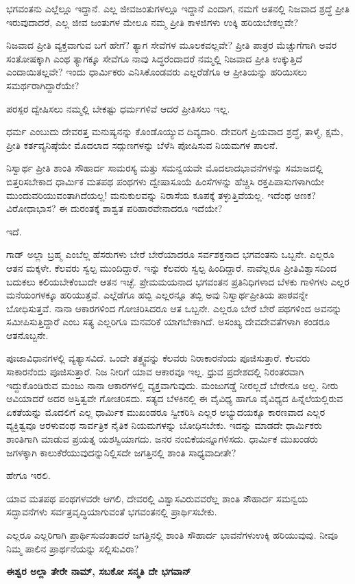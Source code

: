 ಭಗವಂತನು ಎಲ್ಲೆಲ್ಲೂ ಇದ್ದಾನೆ. ಎಲ್ಲ ಜೀವಜಂತುಗಳಲ್ಲೂ ಇದ್ದಾನೆ ಎಂದಾಗ, ನಮಗೆ ಆತನಲ್ಲಿ ನಿಜವಾದ ಶ್ರದ್ಧೆ ಪ್ರೀತಿ ಇರುವುದಾದರೆ, ಎಲ್ಲ ಜೀವ ಜಂತುಗಳ ಮೇಲೂ ನಮ್ಮ ಪ್ರೀತಿ ಕಾಳಜಿಗಳು ಉಕ್ಕಿ ಹರಿಯಬೇಕಲ್ಲವೇ?

ನಿಜವಾದ ಪ್ರೀತಿ ವ್ಯಕ್ತವಾಗುವ ಬಗೆ ಹೇಗೆ? ತ್ಯಾಗ ಸೇವೆಗಳ ಮೂಲಕವಲ್ಲವೇ? ಪ್ರೀತಿ ಪಾತ್ರರ ಮೆಚ್ಚುಗೆಗಾಗಿ ಅವರ ಸಂತೋಷಕ್ಕಾಗಿ ಎಂಥ ತ್ಯಾಗಕ್ಕೂ ಸೇವೆಗೂ ನಾವು ಸಿದ್ಧರೆಂದಾದರೆ ನಮ್ಮಲ್ಲಿ ನಿಜವಾದ ಪ್ರೀತಿ ಉಕ್ಕುತ್ತಿದೆ ಎಂದಾಯಿತಲ್ಲವೇ? ಇಂದು ಧಾರ್ಮಿಕರು ಎನಿಸಿಕೊಂಡವರು ಎಲ್ಲರೆಡೆಗೂ ಆ ಪ್ರೀತಿಯನ್ನು ಹರಿಯಿಸಲು ಸಮರ್ಥರಾಗಿದ್ದಾರೆಯೇ?

ಪರಸ್ಪರ ದ್ವೇಷಿಸಲು ನಮ್ಮಲ್ಲಿ ಬೇಕಷ್ಟು ಧರ್ಮಗಳಿವೆ ಆದರೆ ಪ್ರೀತಿಸಲು ಇಲ್ಲ.

ಧರ್ಮ ಎಂಬುದು ದೇವರತ್ತ ಮನುಷ್ಯನನ್ನು ಕೊಂಡೊಯ್ಯುವ ದಿವ್ಯದಾರಿ. ದೇವರಿಗೆ ಪ್ರಿಯವಾದ ಶ್ರದ್ಧೆ, ತಾಳ್ಮೆ, ಕ್ಷಮೆ, ಪ್ರೀತಿ ಕರ್ತವ್ಯನಿಷ್ಠೆಯೇ ಮೊದಲಾದ ಸದ್ಗುಣಗಳನ್ನು ಬೆಳೆಸಿ ಪೋಷಿಸುವ ನಿಯಮಗಳ ಪಾಲನೆ.

ನಿಸ್ವಾರ್ಥ ಪ್ರೀತಿ ಶಾಂತಿ ಸೌಹಾರ್ದ ಸಾಮರಸ್ಯ ಮತ್ತು ಸಮನ್ವಯವೇ ಮೊದಲಾದ\break ಭಾವನೆಗಳನ್ನು ಸಮಾಜದಲ್ಲಿ ಬಿತ್ತರಿಸಬೇಕಾದ ಧಾರ್ಮಿಕ ಮತಪಥ ಪಂಥಗಳು ದ್ವೇಷಾ\-ಸೂಯೆ ಹಿಂಸೆಗಳನ್ನು ಹೆಚ್ಚಿಸಿ ರಕ್ತಪಿಪಾಸುಗಳಾಗಿಯೇ ಮುಂದುವರಿಯುವಂತಾಗಿದೆಯಲ್ಲ! ಮನು\-ಕುಲವನ್ನು ನಿರಾಸೆಯ ಕೂಪಕ್ಕೆ ತಳ್ಳುತ್ತಿವೆಯಲ್ಲ. ಇದೆಂಥ ಅಣಕ? ವಿರೋಧಾಭಾಸ? ಈ ದುರಂತಕ್ಕೆ ಶಾಶ್ವತ ಪರಿಹಾರವೇನಾದರೂ ಇದೆಯೇ?

ಇದೆ.

ಗಾಡ್ ಅಲ್ಲಾ ಬ್ರಹ್ಮ ಎಂಬೆಲ್ಲ ಹೆಸರುಗಳು ಬೇರೆ ಬೇರೆಯಾದರೂ ಸರ್ವಶಕ್ತನಾದ ಭಗವಂತನು ಒಬ್ಬನೇ. ಎಲ್ಲರೂ ಆತನ ಮಕ್ಕಳೇ. ಕೆಲವರು ಸ್ವಲ್ಪ ಮುಂದಿದ್ದಾರೆ. ಇನ್ನು ಕೆಲವರು ಸ್ವಲ್ಪ ಹಿಂದಿದ್ದಾರೆ. ನಾವೆಲ್ಲರೂ ಪ್ರೀತಿವಿಶ್ವಾಸದಿಂದ ಬದುಕಲು ಕಲಿಯಬೇಕೆಂಬುದೇ ಆತನ ಇಚ್ಛೆ. ಪ್ರೇಮಮಯನಾದ ಭಗವಂತನ ಪ್ರತಿನಿಧಿಗಳಾದ ಬೆಳಕು ಗಾಳಿಗಳು ಎಲ್ಲರ ಮನೆಯಂಗಳಕ್ಕೂ ಹರಿಯುತ್ತವೆ. ಎಲ್ಲೆಡೆಗೂ ಹಬ್ಬಿ ಎಲ್ಲರನ್ನೂ ತಬ್ಬಿ ಅವು ನಿಸ್ವಾರ್ಥಪ್ರೀತಿಯ ಪಾಠವನ್ನೇ ಬೋಧಿಸುತ್ತವೆ. ನಾನಾ ಆಕಾರಗಳಿಂದ ಗೋಚರಿಸಿದರೂ ಆತ ಒಬ್ಬನೇ. ಎಲ್ಲರೂ ಬೇರೆ ಬೇರೆ ಪಥಗಳಿಂದ ಅವನನ್ನು ಸಮೀಪಿಸುತ್ತಿದ್ದಾರೆ ಎಂಬ ಸತ್ಯ ಎಲ್ಲರಿಗೂ ಮನವರಿಕೆ ಯಾಗಬೇಕಾಗಿದೆ. ಅಸಂಖ್ಯ ದೇವದೇವತೆಗಳಾಗಿ ಕಂಡರೂ ಆತನೊಬ್ಬನೇ.

ಪೂಜಾವಿಧಾನಗಳಲ್ಲಿ ವ್ಯತ್ಯಾಸವಿದೆ. ಒಂದೇ ತತ್ತ್ವವನ್ನು ಕೆಲವರು ನಿರಾಕಾರನೆಂದು ಪೂಜಿಸುತ್ತಾರೆ. ಕೆಲವರು ಸಾಕಾರನೆಂದು ಪೂಜಿಸುತ್ತಾರೆ. ನಿಜ ನೀರಿಗೆ ಯಾವ ಆಕಾರವೂ ಇಲ್ಲ. ಧ್ರುವ ಪ್ರದೇಶದಲ್ಲಿ ನಿರಂತರವಾಗಿ ಇದ್ದುಕೊಂಡಿರುವ ಮಂಜು ನಾನಾ ಆಕಾರಗಳಲ್ಲಿ ವ್ಯಕ್ತವಾಗುವುದು. ಮಂಜುಗಡ್ಡೆ ನೀರಲ್ಲದೆ ಬೇರೇನೂ ಅಲ್ಲ. ನೀರು ಆವಿಯಾದರೆ ಅದರ ಅಸ್ತಿತ್ವವೇ ಗೋಚರಿಸದು. ಸತ್ಯದ ಬೆಳಕಿನಲ್ಲಿ ಈ ವೈವಿಧ್ಯ ಹಾಗೂ ವೈವಿಧ್ಯದ ಹಿನ್ನೆಲೆಯಲ್ಲಿರುವ ಏಕತೆಯನ್ನು ಮೊದಲಿಗೆ ಎಲ್ಲ ಧಾರ್ಮಿಕ ಮುಖಂಡರೂ ಸ್ವೀಕರಿಸಿ ಎಲ್ಲರ ಅಭ್ಯುದಯಕ್ಕೂ ಕಾರಣವಾದ ಎಲ್ಲರ ವ್ಯಕ್ತಿತ್ವವೂ ಅರಳುವಂಥ ಸಾರ್ವತ್ರಿಕ ನೈತಿಕ ನಿಯಮಗಳನ್ನು ಬೋಧಿಸಬೇಕು. ಇದನ್ನು ಮಾಡದೇ ಧಾರ್ಮಿಕರು ಶಾಂತಿಗಾಗಿ ಮಾಡುವ ಪ್ರಯತ್ನ ಯಶಸ್ವಿಯಾಗದು. ಜನರ ನಂಬಿಕೆಯನ್ನೂಗಳಿಸದು. ಧಾರ್ಮಿಕ ಮುಖಂಡರು ಜಗಳಕ್ಕಾಗಿ ಕಾಲುಕೆರೆಯುವುದನ್ನು\break ನಿಲ್ಲಿಸದೇ ಜಗತ್ತಿನಲ್ಲಿ ಶಾಂತಿ ಸಾಧ್ಯವಾದೀತೇ?

ಹೇಗೂ ಇರಲಿ.

ಯಾವ ಮತಪಥ ಪಂಥಗಳವರೇ ಆಗಲಿ, ದೇವರಲ್ಲಿ ವಿಶ್ವಾಸವಿರುವವರೆಲ್ಲ ಶಾಂತಿ ಸೌಹಾರ್ದ ಸಮನ್ವಯ ಸದ್ಭಾವನೆಗಳು ಸರ್ವತ್ರವೃದ್ಧಿಯಾಗುವಂತೆ ಭಗವಂತನಲ್ಲಿ ಪ್ರಾರ್ಥಿಸಬೇಕು.

ಎಲ್ಲರೂ ಎಲ್ಲರಿಗಾಗಿ ಪ್ರಾರ್ಥಿಸುವಂತಾದರೆ ಜಗತ್ತಿನಲ್ಲಿ ಶಾಂತಿ ಸೌಹಾರ್ದ ಭಾವನೆಗಳು\break ಉಕ್ಕಿ ಹರಿಯುವುವು. ನೀವೂ ನಿಮ್ಮ ಪಾಲಿನ ಪ್ರಾರ್ಥನೆಯನ್ನು ಸಲ್ಲಿಸುವಿರಾ?

\begin{center}
\textbf{ಈಶ್ವರ ಅಲ್ಲಾ ತೇರೇ ನಾಮ್, ಸಬಕೋ ಸನ್ಮತಿ ದೇ ಭಗವಾನ್}
\end{center}

\chapterend


